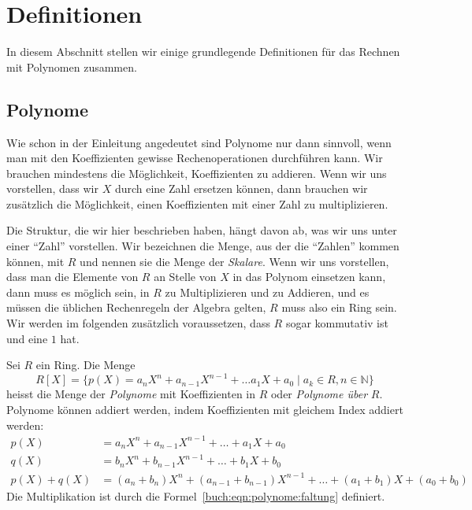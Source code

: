 %
%
%
\section{Definitionen
\label{buch:section:polynome:definitionen}}
In diesem Abschnitt stellen wir einige grundlegende Definitionen für das
Rechnen mit Polynomen zusammen.

%
%
\subsection{Polynome
\label{buch:subsection:polynome:polynome}}
Wie schon in der Einleitung angedeutet sind Polynome nur dann sinnvoll,
wenn man mit den Koeffizienten gewisse Rechenoperationen durchführen kann.
Wir brauchen mindestens die Möglichkeit, Koeffizienten zu addieren.
Wenn wir uns vorstellen, dass wir $X$ durch eine Zahl ersetzen können,
dann brauchen wir zusätzlich die Möglichkeit, einen Koeffizienten mit einer
Zahl zu multiplizieren.

Die Struktur, die wir hier beschrieben haben, hängt davon ab, was wir uns
unter einer ``Zahl'' vorstellen.
Wir bezeichnen die Menge, aus der die ``Zahlen'' kommen können, mit $R$ und
nennen sie die Menge der {\em Skalare}.
%
Wenn wir uns vorstellen, dass man die Elemente von $R$ an Stelle von $X$
in das Polynom einsetzen kann, dann muss es möglich sein, in $R$ zu
Multiplizieren und zu Addieren, und es müssen die üblichen Rechenregeln
der Algebra gelten, $R$ muss also ein Ring sein.
%
Wir werden im folgenden zusätzlich voraussetzen, dass $R$ sogar kommutativ
ist und eine $1$ hat.

\begin{definition}
Sei $R$ ein Ring.
Die Menge
\[
R[X]
=
\{
p(X) = a_nX^n+a_{n-1}X^{n-1} + \dots a_1X+a_0 \mid a_k\in R, n\in\mathbb{N}
\}
\]
heisst die Menge der {\em Polynome} mit Koeffizienten in $R$
oder
{\em Polynome über} $R$.
%
Polynome können addiert werden, indem Koeffizienten mit gleichem Index
addiert werden:
\begin{align*}
p(X) &= a_nX^n + a_{n-1}X^{n-1} + \dots + a_1X + a_0\\
q(X) &= b_nX^n + b_{n-1}X^{n-1} + \dots + b_1X + b_0\\
p(X)+q(X)
&=
(a_n+b_n)X^n
+
(a_{n-1}+b_{n-1})X^{n-1}
+
\dots
+
(a_1+b_1)X
+
(a_0+b_0)
\end{align*}
Die Multiplikation ist durch die Formel~\eqref{buch:eqn:polynome:faltung}
definiert.
\end{definition}

